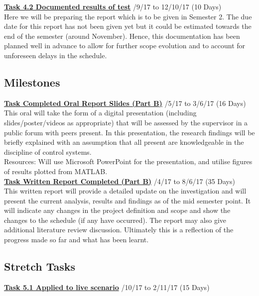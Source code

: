 \documentclass[11pt,draftd]{article}
\begin{document}
\begin{appendices}
	\noindent\underline{\textbf{Task 4.2 Documented results of test}} /9/17 to 12/10/17 (10 Days) \\
	
	Here we will be preparing the report which is to be given in Semester 2. The due date for this report has not been given yet but it could be estimated towards the end of the semester (around November). Hence, this documentation has been planned well in advance to allow for further scope evolution and to account for unforeseen delays in the schedule.
	
	\subsection{Milestones}
	\underline{\textbf{Task Completed Oral Report Slides (Part B)}} /5/17 to 3/6/17 (16 Days) \\
	
	This oral will take the form of a digital presentation (including slides/poster/videos as appropriate) that will be assessed by the supervisor in a public forum with peers present. In this presentation, the research findings will be briefly explained with an assumption that all present are knowledgeable in the discipline of control systems. \\
	Resources: Will use Microsoft PowerPoint for the presentation, and utilise figures of results plotted from MATLAB. \\
	
	\noindent\underline{\textbf{Task Written Report Completed (Part B)}} /4/17 to 8/6/17 (35 Days) \\
	
	This written report will provide a detailed update on the investigation and will present the current analysis, results and findings as of the mid semester point. It will indicate any changes in the project definition and scope and show the changes to the schedule (if any have occurred). The report may also give additional literature review discussion. Ultimately this is a reflection of the progress made so far and what has been learnt. \\
		
	\subsection{Stretch Tasks}
	\underline{\textbf{Task 5.1 Applied to live scenario}} /10/17 to 2/11/17 (15 Days) \\
	

\end{appendices}
\end{document}
